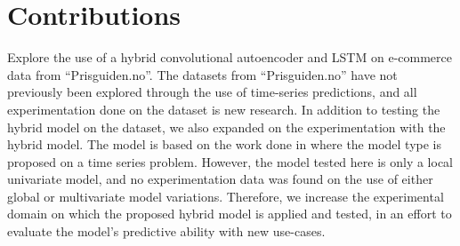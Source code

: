 
\section{Contributions}
\label{section:Discussion:Contributions}

Explore the use of a hybrid convolutional autoencoder and LSTM on e-commerce data from ``Prisguiden.no''.
The datasets from ``Prisguiden.no'' have not previously been explored through the use of time-series predictions,
and all experimentation done on the dataset is new research.
In addition to testing the hybrid model on the dataset,
we also expanded on the experimentation with the hybrid model.
The model is based on the work done in \cite{Zhao2019} where the model type is proposed on a time series problem.
However, the model tested here is only a local univariate model, and no experimentation data was found
on the use of either global or multivariate model variations.
Therefore, we increase the experimental domain on which the proposed hybrid model is applied and tested,
in an effort to evaluate the model's predictive ability with new use-cases.

